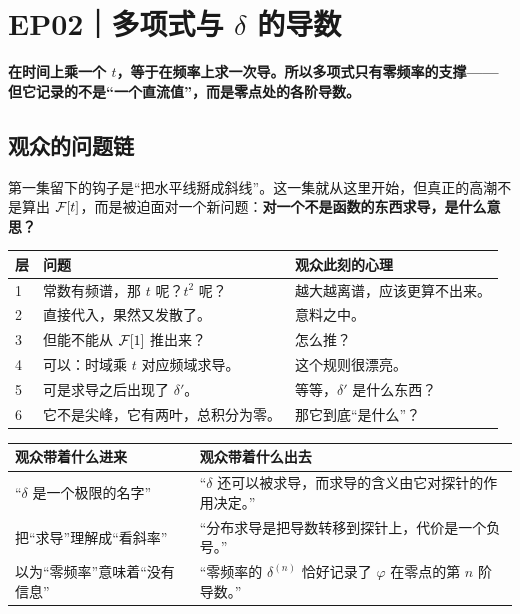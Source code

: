 \chapter{EP02｜多项式与 $\delta$ 的导数}

\begin{ideabox}[这一集的一句话]
\textbf{在时间上乘一个 $t$，等于在频率上求一次导。所以多项式只有零频率的支撑——但它记录的不是“一个直流值”，而是零点处的各阶导数。}
\end{ideabox}

\section{观众的问题链}

第一集留下的钩子是“把水平线掰成斜线”。这一集就从这里开始，但真正的高潮不是算出 $\mathcal{F}[t]$，而是被迫面对一个新问题：\textbf{对一个不是函数的东西求导，是什么意思？}

\begin{center}
\small
\renewcommand{\arraystretch}{1.32}
\begin{tabularx}{\textwidth}{@{}p{0.8cm}X p{4.4cm}@{}}
\toprule
层 & 问题 & 观众此刻的心理 \\
\midrule
1 & 常数有频谱，那 $t$ 呢？$t^{2}$ 呢？ & 越大越离谱，应该更算不出来。\\
2 & 直接代入，果然又发散了。 & 意料之中。\\
3 & 但能不能从 $\mathcal{F}[1]$ 推出来？ & 怎么推？\\
4 & 可以：时域乘 $t$ 对应频域求导。 & 这个规则很漂亮。\\
5 & 可是求导之后出现了 $\delta'$。 & 等等，$\delta'$ 是什么东西？\\
6 & 它不是尖峰，它有两叶，总积分为零。 & 那它到底“是什么”？\\
\bottomrule
\end{tabularx}
\end{center}

\begin{center}
\small
\renewcommand{\arraystretch}{1.32}
\begin{tabularx}{\textwidth}{@{}p{3.2cm}Y@{}}
\toprule
观众带着什么进来 & 观众带着什么出去 \\
\midrule
“$\delta$ 是一个极限的名字” & “$\delta$ 还可以被求导，而求导的含义由它对探针的作用决定。”\\
把“求导”理解成“看斜率” & “分布求导是把导数转移到探针上，代价是一个负号。”\\
以为“零频率”意味着“没有信息” & “零频率的 $\delta^{(n)}$ 恰好记录了 $\varphi$ 在零点的第 $n$ 阶导数。”\\
\bottomrule
\end{tabularx}
\end{center}

